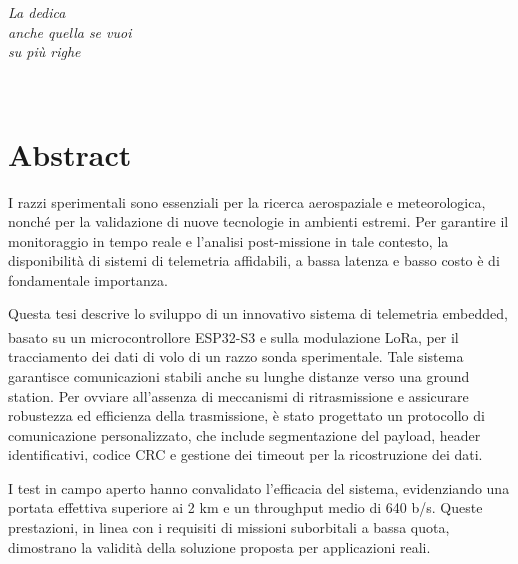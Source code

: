 \documentclass[12pt,a4paper,twoside]{book}
\begin{document}

\ifdefined\HCode
\else
    \topmargin=5.5cm
    \begin{flushright}
        \emph{
            \LARGE{La dedica}\\\vspace{3mm}
            \LARGE{anche quella se vuoi}\\\vspace{3mm}
            \LARGE{su più righe}
        }
    \end{flushright}
\fi
\newpage~\newpage
{}
\chapter*{Abstract}
I razzi sperimentali sono essenziali per la ricerca aerospaziale e meteorologica,
nonché per la validazione di nuove tecnologie in ambienti estremi.
Per garantire il monitoraggio in tempo reale e l'analisi post-missione in tale
contesto, la disponibilità di sistemi di telemetria affidabili, a bassa latenza
e basso costo è di fondamentale importanza.

Questa tesi descrive lo sviluppo di un innovativo sistema di telemetria embedded,
basato su un microcontrollore ESP32-S3 e sulla modulazione LoRa\textsuperscript{\textcopyright},
per il tracciamento dei dati di volo di un razzo sonda sperimentale. Tale sistema
garantisce comunicazioni stabili anche su lunghe distanze verso una ground station.
Per ovviare all'assenza di meccanismi di ritrasmissione e assicurare robustezza
ed efficienza della trasmissione, è stato progettato un protocollo di comunicazione
personalizzato, che include segmentazione del payload, header identificativi,
codice CRC e gestione dei timeout per la ricostruzione dei dati.

I test in campo aperto hanno convalidato l'efficacia del sistema, evidenziando una
portata effettiva superiore ai 2 km e un throughput medio di 640 b/s. Queste
prestazioni, in linea con i requisiti di missioni suborbitali a bassa quota,
dimostrano la validità della soluzione proposta per applicazioni reali.

\topmargin=-1cm
\tableofcontents
\thispagestyle{empty}
\listoftables
\thispagestyle{empty}
\listoffigures
\thispagestyle{empty}
\newpage~\newpage
\end{document}
